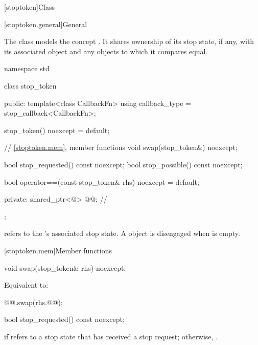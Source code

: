 [stoptoken]{Class }%
%

[stoptoken.general]{General}

\pnum
{}%
The class  models the concept .
It shares ownership of its stop state, if any,
with its associated  object and
any  objects to which it compares equal.

\begin{codeblock}
namespace std {
  class stop_token {
  public:
    template<class CallbackFn>
      using callback_type = stop_callback<CallbackFn>;

    stop_token() noexcept = default;

    // \ref{stoptoken.mem}, member functions
    void swap(stop_token&) noexcept;

    bool stop_requested() const noexcept;
    bool stop_possible() const noexcept;

    bool operator==(const stop_token& rhs) noexcept = default;

  private:
    shared_ptr<@\unspec@> @@;                           // \expos
  };
}
\end{codeblock}

\pnum
{} refers to the 's associated stop state.
A  object is disengaged when  is empty.

[stoptoken.mem]{Member functions}

%
\begin{itemdecl}
void swap(stop_token& rhs) noexcept;
\end{itemdecl}

\begin{itemdescr}
\pnum
\effects
Equivalent to:
\begin{codeblock}
@@.swap(rhs.@@);
\end{codeblock}
\end{itemdescr}

%
\begin{itemdecl}
bool stop_requested() const noexcept;
\end{itemdecl}

\begin{itemdescr}
\pnum
\returns
{} if  refers to a stop state
that has received a stop request;
otherwise, .
\end{itemdescr}

